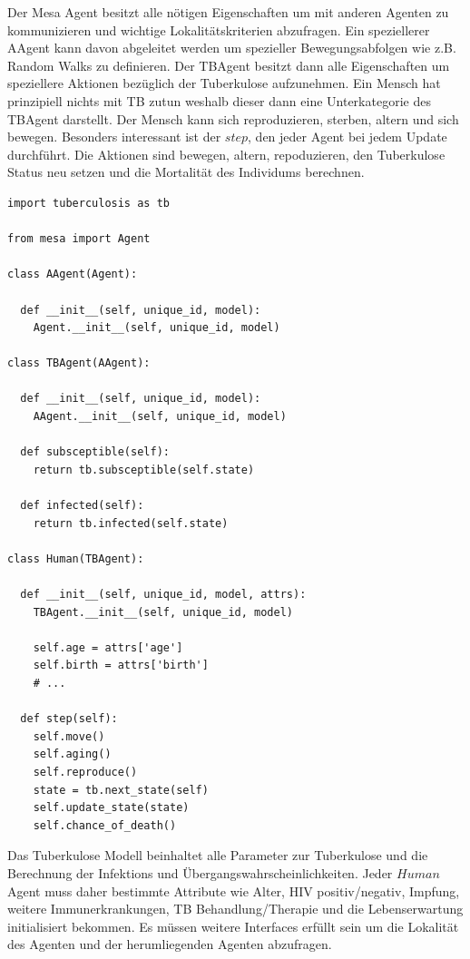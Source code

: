 \documentclass[paper=a4, fontsize=11pt, ngerman, abstract=on]{scrartcl}
\numberwithin{equation}{section} %
\numberwithin{figure}{section} %
\numberwithin{table}{section} %
\begin{document}
Der Mesa Agent besitzt alle nötigen Eigenschaften um mit anderen Agenten zu kommunizieren und wichtige Lokalitätskriterien abzufragen. Ein speziellerer AAgent kann davon abgeleitet werden um spezieller Bewegungsabfolgen wie z.B. Random Walks zu definieren. Der TBAgent besitzt dann alle Eigenschaften um speziellere Aktionen bezüglich der Tuberkulose aufzunehmen. Ein Mensch hat prinzipiell nichts mit TB zutun weshalb dieser dann eine Unterkategorie des TBAgent darstellt. Der Mensch kann sich reproduzieren, sterben, altern und sich bewegen. Besonders interessant ist der $step$, den jeder Agent bei jedem Update durchführt. Die Aktionen sind bewegen, altern, repoduzieren, den Tuberkulose Status neu setzen und die Mortalität des Individums berechnen.

\begin{lstlisting}[style=python]
import tuberculosis as tb

from mesa import Agent

class AAgent(Agent):

  def __init__(self, unique_id, model):
    Agent.__init__(self, unique_id, model)

class TBAgent(AAgent):

  def __init__(self, unique_id, model):
    AAgent.__init__(self, unique_id, model)

  def subsceptible(self):
    return tb.subsceptible(self.state)

  def infected(self):
    return tb.infected(self.state)

class Human(TBAgent):

  def __init__(self, unique_id, model, attrs):
    TBAgent.__init__(self, unique_id, model)

    self.age = attrs['age']
    self.birth = attrs['birth']
    # ...

  def step(self):
    self.move()
    self.aging()
    self.reproduce()
    state = tb.next_state(self)
    self.update_state(state)
    self.chance_of_death()
\end{lstlisting}

Das Tuberkulose Modell beinhaltet alle Parameter zur Tuberkulose und die Berechnung der Infektions und Übergangswahrscheinlichkeiten. Jeder $Human$ Agent muss daher bestimmte Attribute wie Alter, HIV positiv/negativ, Impfung, weitere Immunerkrankungen, TB Behandlung/Therapie und die Lebenserwartung initialisiert bekommen. Es müssen weitere Interfaces erfüllt sein um die Lokalität des Agenten und der herumliegenden Agenten abzufragen.
\end{document}
